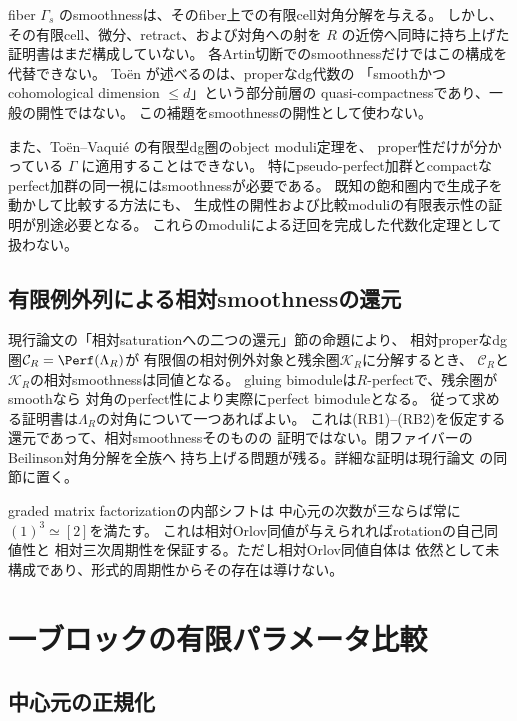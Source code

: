 \begin{remark}[現時点で未解決の点]\label{rem:relative-saturation-gap}
 fiber \(\Gamma_s\) のsmoothnessは、そのfiber上での有限cell対角分解を与える。
 しかし、その有限cell、微分、retract、および対角への射を
 \(R\) の近傍へ同時に持ち上げた証明書はまだ構成していない。
 各Artin切断でのsmoothnessだけではこの構成を代替できない。
 Toën \cite[Lemma 3.14]{ToenFinitude} が述べるのは、properなdg代数の
 「smoothかつcohomological dimension \(\le d\)」という部分前層の
 quasi-compactnessであり、一般の開性ではない。
 この補題をsmoothnessの開性として使わない。

 また、Toën--Vaquié \cite[Theorem 3.6]{TV} の有限型dg圏のobject moduli定理を、
 proper性だけが分かっている \(\Gamma\) に適用することはできない。
 特にpseudo-perfect加群とcompactなperfect加群の同一視にはsmoothnessが必要である。
 既知の飽和圏内で生成子を動かして比較する方法にも、
 生成性の開性および比較moduliの有限表示性の証明が別途必要となる。
 これらのmoduliによる迂回を完成した代数化定理として扱わない。
\end{remark}


\subsection{有限例外列による相対smoothnessの還元}
現行論文の「相対saturationへの二つの還元」節の命題により、
相対properなdg圏$\mathcal C_R=\Perf(\Lambda_R)$が
有限個の相対例外対象と残余圏$\mathcal K_R$に分解するとき、
$\mathcal C_R$と$\mathcal K_R$の相対smoothnessは同値となる。
gluing bimoduleは$R$-perfectで、残余圏がsmoothなら
対角のperfect性により実際にperfect bimoduleとなる。
従って求める証明書は$\Lambda_R$の対角について一つあればよい。
これは(RB1)--(RB2)を仮定する還元であって、相対smoothnessそのものの
証明ではない。閉ファイバーのBeilinson対角分解を全族へ
持ち上げる問題が残る。詳細な証明は現行論文
の同節に置く。

graded matrix factorizationの内部シフトは
中心元の次数が三ならば常に$(1)^3\simeq[2]$を満たす。
これは相対Orlov同値が与えられればrotationの自己同値性と
相対三次周期性を保証する。ただし相対Orlov同値自体は
依然として未構成であり、形式的周期性からその存在は導けない。

\section{一ブロックの有限パラメータ比較}

\subsection{中心元の正規化}

